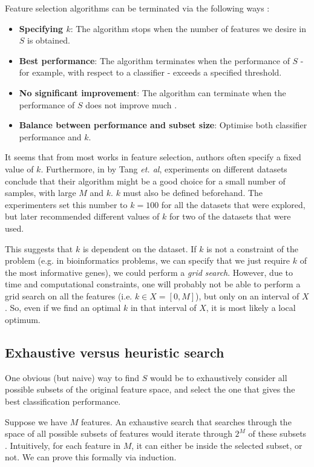 \documentclass[12pt, twoside, a4paper]{report}
\begin{document}
Feature selection algorithms can be terminated via the following ways \cite{RefWorks:210}:
\begin{itemize}
  \item \textbf{Specifying $k$}: The algorithm stops when the number of features we desire in $S$ is obtained.
  \item \textbf{Best performance}: The algorithm terminates when the performance of $S$ - for example, with respect to a classifier - exceeds a specified threshold.
  \item \textbf{No significant improvement}: The algorithm can terminate when the performance of $S$ does not improve much \cite{RefWorks:215}.
  \item \textbf{Balance between performance and subset size}: Optimise both classifier performance and $k$.
\end{itemize}

It seems that from most works in feature selection, authors often specify a fixed value of $k$. Furthermore, in \cite{RefWorks:119} by Tang \textit{et. al}, experiments on different datasets conclude that their algorithm might be a good choice for a small number of samples, with large $M$ and $k$. $k$ must also be defined beforehand. The experimenters set this number to $k=100$ for all the datasets that were explored, but later recommended different values of $k$ for two of the datasets that were used.

This suggests that $k$ is dependent on the dataset. If $k$ is not a constraint of the problem (e.g. in bioinformatics problems, we can specify that we just require $k$ of the most informative genes), we could perform a \textit{grid search}. However, due to time and computational constraints, one will probably not be able to perform a grid search on all the features (i.e. $k \in X = [0, M]$), but only on an interval of $X$. So, even if we find an optimal $k$ in that interval of $X$, it is most likely a local optimum.


\subsection{Exhaustive versus heuristic search} \label{bg:fs:exhaustive}

One obvious (but naive) way to find $S$ would be to exhaustively consider all possible subsets of the original feature space, and select the one that gives the best classification performance.

Suppose we have $M$ features. An exhaustive search that searches through the space of all possible subsets of features would iterate through $2^M$ of these subsets \cite{RefWorks:182}. Intuitively, for each feature in $M$, it can either be inside the selected subset, or not. We can prove this formally via induction.
\end{document}

